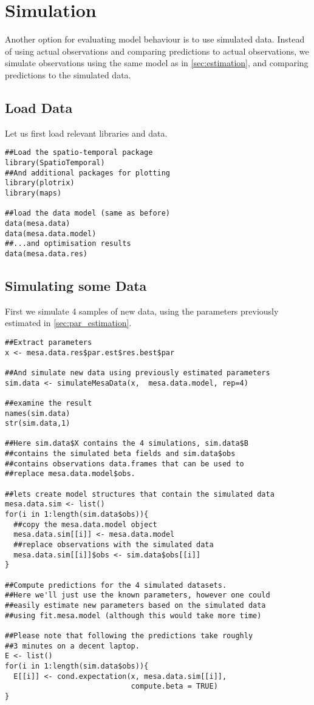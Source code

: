 \section{Simulation} \label{app:simulation}
Another option for evaluating model behaviour is to use simulated data.
Instead of using actual observations and comparing predictions to actual 
observations, we simulate  observations using the same model as
in \autoref{sec:estimation}, and comparing predictions to the simulated data.

\subsection{Load Data}
Let us first load relevant libraries and data.
\vspace*{-0.5\baselineskip}
\begin{verbatim}
##Load the spatio-temporal package
library(SpatioTemporal)
##And additional packages for plotting
library(plotrix) 
library(maps)

##load the data model (same as before)
data(mesa.data)
data(mesa.data.model)
##...and optimisation results
data(mesa.data.res)
\end{verbatim}

\subsection{Simulating some Data}
First we simulate 4 samples of new data, using the parameters previously 
estimated in \autoref{sec:par_estimation}.
\vspace*{-0.5\baselineskip}
\begin{verbatim}
##Extract parameters
x <- mesa.data.res$par.est$res.best$par

##And simulate new data using previously estimated parameters
sim.data <- simulateMesaData(x,  mesa.data.model, rep=4)

##examine the result
names(sim.data)
str(sim.data,1)

##Here sim.data$X contains the 4 simulations, sim.data$B 
##contains the simulated beta fields and sim.data$obs 
##contains observations data.frames that can be used to 
##replace mesa.data.model$obs.

##lets create model structures that contain the simulated data
mesa.data.sim <- list()
for(i in 1:length(sim.data$obs)){
  ##copy the mesa.data.model object
  mesa.data.sim[[i]] <- mesa.data.model
  ##replace observations with the simulated data
  mesa.data.sim[[i]]$obs <- sim.data$obs[[i]]
}

##Compute predictions for the 4 simulated datasets.
##Here we'll just use the known parameters, however one could 
##easily estimate new parameters based on the simulated data 
##using fit.mesa.model (although this would take more time)

##Please note that following the predictions take roughly 
##3 minutes on a decent laptop.
E <- list()
for(i in 1:length(sim.data$obs)){
  E[[i]] <- cond.expectation(x, mesa.data.sim[[i]], 
                             compute.beta = TRUE)
}
\end{verbatim}

